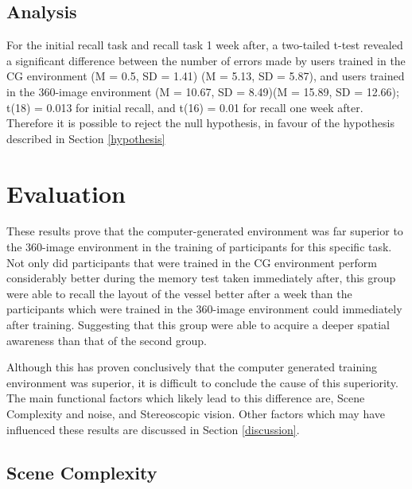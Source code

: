 \documentclass[ %
                    author={Elis Jones},
                supervisor={Dr. Kirsten Cater},
                    degree={BSc},
                     title={The Effect of Presentation Medium on Spatial Cognition},
                  subtitle={in the Virtual Environment},
                      year={2018} ]{dissertation}
\begin{document}
\subsection{Analysis}
For the initial recall task and recall task 1 week after, a two-tailed t-test revealed a significant difference between the number of errors made by users trained in the CG environment (M = 0.5, SD = 1.41) (M = 5.13, SD = 5.87),  and users trained in the 360-image environment (M = 10.67, SD = 8.49)(M = 15.89, SD = 12.66); t(18) = 0.013 for initial recall, and t(16) = 0.01 for recall one week after. Therefore it is possible to reject the null hypothesis, in favour of the hypothesis described in Section \ref{hypothesis}

\section{Evaluation}
These results prove that the computer-generated environment was far superior to the 360-image environment in the training of participants for this specific task. Not only did participants that were trained in the CG environment perform considerably better during the memory test taken immediately after, this group were able to recall the layout of the vessel better after a week than the participants which were trained in the 360-image environment could immediately after training. Suggesting that this group were able to acquire a deeper spatial awareness than that of the second group. 

Although this has proven conclusively that the computer generated training environment was superior, it is difficult to conclude the cause of this superiority. The main functional factors which likely lead to this difference are, Scene Complexity and noise, and Stereoscopic vision. Other factors which may have influenced these results are discussed in Section \ref{discussion}.

\subsection{Scene Complexity}
\end{document}
